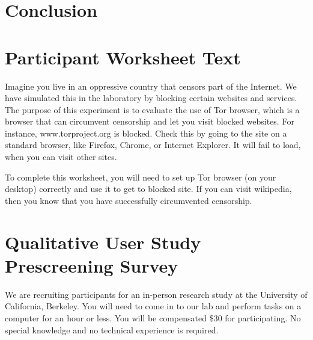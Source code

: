 \documentclass{template}
\begin{document}

\section{Conclusion} 


 

\appendix
\section{Participant Worksheet Text} 
Imagine you live in an oppressive country that censors part of the Internet. We have simulated this in the laboratory by blocking certain websites and services. The purpose of this experiment is to evaluate the use of Tor browser, which is a browser that can circumvent censorship and let you visit blocked websites. For instance, www.torproject.org is blocked. Check this by going to the site on a standard browser, like Firefox, Chrome, or Internet Explorer. It will fail to load, when you can visit other sites.

To complete this worksheet, you will need to set up Tor browser (on your desktop) correctly and use it to get to blocked site. If you can visit wikipedia, then you know that you have successfully circumvented censorship.


\section{Qualitative User Study Prescreening Survey} 
We are recruiting participants for an in-person research study at the University of California, Berkeley. You will need to come in to our lab and perform tasks on a computer for an hour or less. You will be compensated \$30 for participating. No special knowledge and no technical experience is required.
\end{document}
